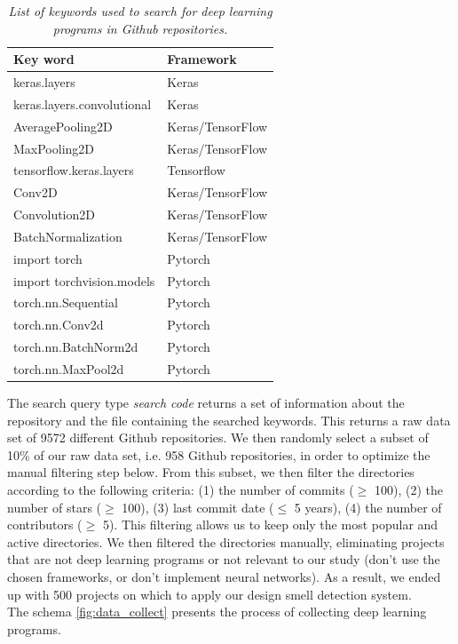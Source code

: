 \begin{table}[h]
  \centering
  \caption{\emph{List of keywords used to search for deep learning programs in Github repositories.}}
  \label{tab:keywords}
  \begin{tabular}{ll}
    \toprule
    \textbf{Key word}          & \textbf{Framework} \\ \midrule
    keras.layers               & Keras              \\
    keras.layers.convolutional & Keras              \\
    AveragePooling2D           & Keras/TensorFlow   \\
    MaxPooling2D               & Keras/TensorFlow   \\
    tensorflow.keras.layers    & Tensorflow         \\
    Conv2D                     & Keras/TensorFlow   \\
    Convolution2D              & Keras/TensorFlow   \\
    BatchNormalization         & Keras/TensorFlow   \\
    import torch               & Pytorch            \\
    import torchvision.models  & Pytorch            \\
    torch.nn.Sequential        & Pytorch            \\
    torch.nn.Conv2d            & Pytorch            \\
    torch.nn.BatchNorm2d       & Pytorch            \\
    torch.nn.MaxPool2d         & Pytorch            \\ \bottomrule
  \end{tabular}
\end{table}


The search query type \emph{search code} returns a set of information about the
repository and the file containing the searched keywords. This returns a raw
data set of 9572 different Github repositories. We then randomly select a subset
of 10\% of our raw data set, i.e. 958 Github repositories, in order to optimize
the manual filtering step below. From this subset, we then filter the
directories according to the following criteria:
(1) the number of commits ($\geq$ 100), (2) the number of stars ($\geq$ 100),
(3) last commit date ($\leq$ 5 years), (4) the number of contributors ($\geq$
5). This filtering allows us to keep only the most popular and active
directories. We then filtered the directories manually, eliminating projects
that are not deep learning programs or not relevant to our study (don't use the
chosen frameworks, or don't implement neural networks). As a result, we ended up
with 500 projects on which to apply our design smell detection system. \\The
schema \ref{fig:data_collect} presents the process of collecting deep learning
programs.\\


